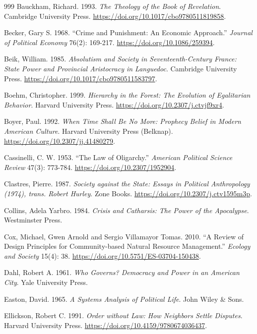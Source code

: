 \documentclass[11pt,letterpaper]{article}
\theoremstyle{definition}
\theoremstyle{remark}
\begin{document}
\begin{small}
\begin{thebibliography}{999}
Bauckham, Richard. 1993. \emph{The Theology of the Book of Revelation}. Cambridge University Press. \url{https://doi.org/10.1017/cbo9780511819858}.

Becker, Gary S. 1968. ``Crime and Punishment: An Economic Approach.'' \emph{Journal of Political Economy} 76(2): 169-217. \url{https://doi.org/10.1086/259394}.

Beik, William. 1985. \emph{Absolutism and Society in Seventeenth-Century France: State Power and Provincial Aristocracy in Languedoc}. Cambridge University Press. \url{https://doi.org/10.1017/cbo9780511583797}.

Boehm, Christopher. 1999. \emph{Hierarchy in the Forest: The Evolution of Egalitarian Behavior}. Harvard University Press. \url{https://doi.org/10.2307/j.ctvjf9xr4}.

Boyer, Paul. 1992. \emph{When Time Shall Be No More: Prophecy Belief in Modern American Culture}. Harvard University Press (Belknap). \url{https://doi.org/10.2307/jj.41480279}.

Cassinelli, C. W. 1953. ``The Law of Oligarchy.'' \emph{American Political Science Review} 47(3): 773-784. \url{https://doi.org/10.2307/1952904}.

Clastres, Pierre. 1987. \emph{Society against the State: Essays in Political Anthropology (1974), trans. Robert Hurley}. Zone Books. \url{https://doi.org/10.2307/j.ctv1595m3p}.

Collins, Adela Yarbro. 1984. \emph{Crisis and Catharsis: The Power of the Apocalypse}. Westminster Press.

Cox, Michael, Gwen Arnold and Sergio Villamayor Tomas. 2010. ``A Review of Design Principles for Community-based Natural Resource Management.'' \emph{Ecology and Society} 15(4): 38. \url{https://doi.org/10.5751/ES-03704-150438}.

Dahl, Robert A. 1961. \emph{Who Governs? Democracy and Power in an American City}. Yale University Press.

Easton, David. 1965. \emph{A Systems Analysis of Political Life}. John Wiley \& Sons.

Ellickson, Robert C. 1991. \emph{Order without Law: How Neighbors Settle Disputes}. Harvard University Press. \url{https://doi.org/10.4159/9780674036437}.


\end{thebibliography}
\end{small}
\end{document}
